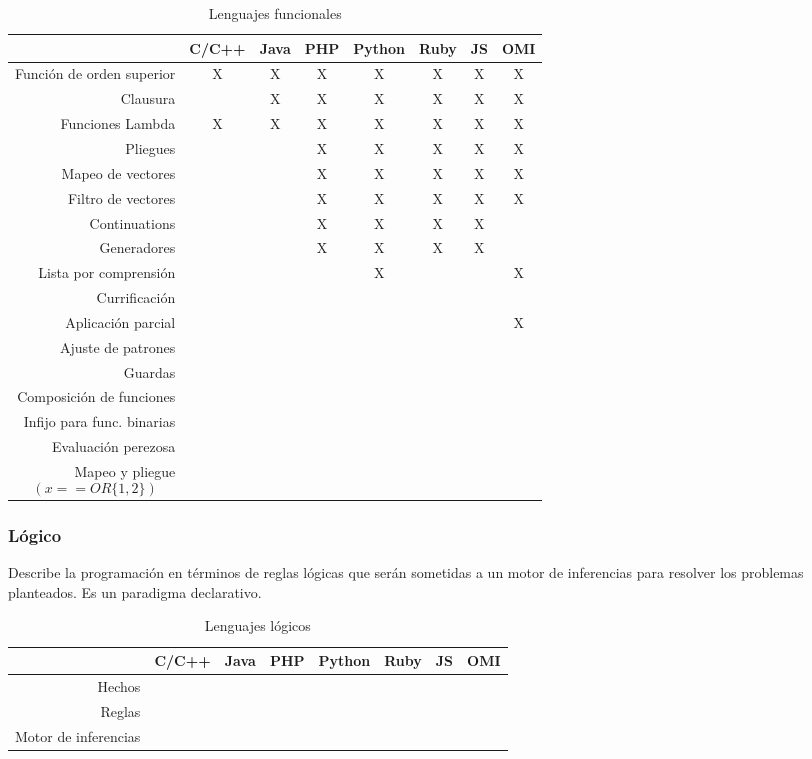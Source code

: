 \FloatBarrier
\begin{table}[h]
\begin{center}
\begin{tabular}{|r|c|c|c|c|c|c|c|} \hline
 & C/C++ & Java & PHP  & Python & Ruby & JS & OMI\\ \hline
Función de orden superior & X & X & X & X & X & X & X \\ \hline
Clausura  &  & X & X & X & X & X & X \\ \hline
Funciones Lambda  &X & X  & X & X & X & X & X \\ \hline
Pliegues & & & X & X & X & X & X \\ \hline
Mapeo de vectores & & & X & X & X & X & X \\ \hline
Filtro de vectores & & & X & X & X & X & X \\ \hline
Continuations &  &  & X & X & X & X &  \\ \hline
Generadores & & & X & X & X & X &  \\ \hline
Lista por comprensión & & &  & X & &  & X \\ \hline
Currificación  & & &  &  &  &  &  \\ \hline
Aplicación parcial & & & & & & & X \\ \hline
Ajuste de patrones & & & & & & &  \\ \hline
Guardas & & & & & & &  \\ \hline
Composición de funciones & & & & & & &  \\ \hline
Infijo para func. binarias & & & & & & &  \\ \hline
Evaluación perezosa & & & & & & &  \\ \hline
Mapeo y pliegue $$(x ==OR \{1,2\})$$ & & & & & & &  \\ \hline
\end{tabular}
\caption{Lenguajes funcionales}
\end{center}
\end{table}
\FloatBarrier

\subsubsection{Lógico}
Describe la programación en términos de reglas lógicas  que serán sometidas
a un motor de inferencias para resolver los problemas planteados. 
Es un paradigma declarativo. 

\FloatBarrier
\begin{table}[h]
\begin{center}
 
\begin{tabular}{|r|c|c|c|c|c|c|c|} \hline
 & C/C++ & Java & PHP  & Python & Ruby & JS & OMI\\ \hline
Hechos & & & & & & &  \\ \hline
Reglas & & & & & & &  \\ \hline
Motor de inferencias & & & & & & &  \\ \hline
\end{tabular}
\caption{Lenguajes lógicos}
\end{center}
\end{table}
\FloatBarrier


